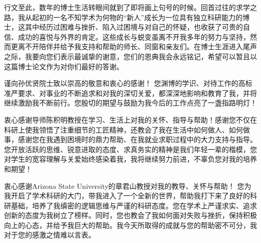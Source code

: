 \begin{thanks}




行文至此，数年的博士生活转眼间就到了即将画上句号的时候。回首过往的求学之路，我从起初的一名不知学术为何物的“新人”成长为一位具有独立科研能力的博士，这其中经历过困难与挫折、陷入过困境与对自己的怀疑，也收获了可贵的自信、成功的喜悦与外界的肯定。这些成长与蜕变虽离不开我多年的努力与坚持，然而更离不开陪伴并给予我支持和帮助的师长、同窗和亲友们。在博士生涯进入尾声之际，我要向您们表示最诚挚的谢意，您们的恩典我会永远铭记，希望可以暂且以这篇博士论文作为对你们最好的答谢。



谨向孙优贤院士致以崇高的敬意和衷心的感谢！ 您渊博的学识、对待工作的高标准严要求、对事业的不断追求和对我的深切关爱，都深深地影响和教育了我，并将继续激励我不断前行。您殷切的期望与鼓励为我今后的工作点亮了一盏指路明灯！


衷心感谢导师陈积明教授在学习、生活上对我的关怀、指导与帮助！感谢您不仅在科研上使我领悟了注重细节的工匠精神，还教会了我在生活中如何做人、如何做事，感谢您在我遇到困境时的鼎力帮助、在我就业求职过程中的大力支持与指导。您开放活跃的思维、锐意进取的态度、求真务实的精神是我们年轻一辈的楷模，您对学生的宽容理解与关爱始终感染着我，我将继续努力前进，不辜负您对我的培养和期望！


衷心感谢Arizona State University的章君山教授对我的教导、关怀与帮助！ 您为我开启了学术科研的大门，带我进入了一个全新的世界，帮助我打下来了良好的科研基础，培养了我缜密的逻辑思维与严谨的科研态度。您在学术上严谨求实、追求创新的态度为我树立了榜样。同时，您也教会了我如何面对失败与挫折，保持积极向上的心态，并给予我巨大的帮助。我今天所取得的成就与您的帮助密不可分，我对于您的感激之情难以言表。



\end{thanks}
